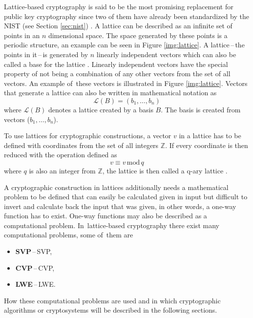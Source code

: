Lattice-based cryptography is said to be the most promising replacement for public key cryptography since two of them have already been standardized by the NIST (see Section \ref{sec:nist}) \cite{Alagic2022}. A lattice can be described as an infinite set of points in an $n$ dimensional space. The space generated by these points is a periodic structure, an example can be seen in Figure \ref{img:lattice}. A lattice\,--\,the points in it\,--\,is generated by $n$ linearly independent vectors which can also be called a base for the lattice \cite{Ajati1996}. Linearly independent vectors have the special property of not being a combination of any other vectors from the set of all vectors. An example of~these vectors is illustrated in Figure \ref{img:lattice}. Vectors that generate a lattice can also be written in mathematical notation as
\begin{equation}
  \mathcal{L}(B)=(b_1,\dots,b_n)
\end{equation}
where $\mathcal{L}(B)$ denotes a lattice created by a basis $B$. The basis is created from vectors ($b_1,\dots,b_n$).


To use lattices for cryptographic constructions, a vector $v$ in a lattice has to be defined with coordinates from the set of all integers $\mathbb{Z}$. If every coordinate is then reduced with the operation defined as
\begin{equation}
  v\equiv v\,\mathrm{mod}\,q
\end{equation}
where $q$ is also an integer from $\mathbb{Z}$, the lattice is then called a q-ary lattice \cite{Bernstein2009}.

A cryptographic construction in lattices additionally needs a mathematical problem to be defined that can easily be calculated given in input but difficult to invert and calculate back the input that was given, in other words, a one-way function has to exist. One-way functions may also be described as a computational problem. In~lattice-based cryptography there exist many computational problems, some of~them are \cite{Bernstein2009}
\begin{itemize}
  \item \textbf{SVP}\,--\,\acl{SVP},
  \item \textbf{CVP}\,--\,\acl{CVP},
  \item \textbf{LWE}\,--\,\acl{LWE}.
\end{itemize}
How these computational problems are used and in which cryptographic algorithms or cryptosystems will be described in the following sections.
